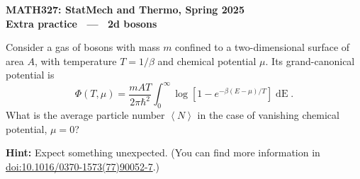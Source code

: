 \documentclass[12 pt]{article} %
\newcommand{\be}{\ensuremath{\beta} }
\renewcommand{\d}[1]{\ensuremath{\mathop{d#1}} }
\newcommand{\vev}[1]{\ensuremath{\left\langle #1 \right\rangle} }
\begin{document}
\newcommand{\thisunit}{MATH327 Extra (2d bosons)}
\newcommand{\moddate}{Last modified 27 Apr.~2025}
\begin{center}
  {\Large \textbf{MATH327: StatMech and Thermo, Spring 2025}} \\[12 pt]
  {\Large \textbf{Extra practice \ --- \ 2d bosons}} \\[24 pt]
\end{center}
Consider a gas of bosons with mass $m$ confined to a two-dimensional surface of area $A$, with temperature $T = 1 / \be$ and chemical potential $\mu$.
Its grand-canonical potential is %
\begin{equation*}
  \Phi(T, \mu) = \frac{mAT}{2\pi \hbar^2} \int_0^{\infty} \log\left[1 - e^{-\be (E - \mu) / T}\right] \d{E}.
\end{equation*}
What is the average particle number $\vev{N}$ in the case of vanishing chemical potential, $\mu = 0$?

\textbf{Hint:} Expect something unexpected.  (You can find more information in \\ \href{https://doi.org/10.1016/0370-1573(77)90052-7}{doi:10.1016/0370-1573(77)90052-7}.)
\end{document}
